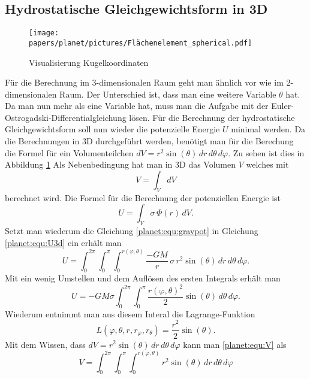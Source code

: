 \subsection{Hydrostatische Gleichgewichtsform in 3D}
\begin{figure}
	\centering
	\texttt{[image: papers/planet/pictures/Flächenelement\_spherical.pdf]}
	\caption{Visualisierung Kugelkoordinaten}
	\label{planet:fig:3d}
\end{figure}
Für die Berechnung im 3-dimensionalen Raum geht man ähnlich vor wie im 2-dimensionalen Raum.
Der Unterschied ist, dass man eine weitere Variable \(\theta\) hat.
Da man nun mehr als eine Variable hat, muss man die Aufgabe mit der Euler-Ostrogadski-Differentialgleichung lösen.
Für die Berechnung der hydrostatische Gleichgewichtsform soll nun wieder die potenzielle Energie \(U\) minimal werden.
Da die Berechnungen in 3D durchgeführt werden, benötigt man für die Berechung die Formel für ein Volumenteilchen \(dV = r^2 \sin (\theta) \, dr \, d\theta \, d\varphi \).
Zu sehen ist dies in Abbildung \ref{planet:fig:3d}
Als Nebenbedingung hat man in 3D das Volumen \(V\) welches mit 
\begin{equation}
	V = \int_{V}^{} dV
	\label{planet:equ:V}
\end{equation}
berechnet wird.
Die Formel für die Berechnung der potenziellen Energie ist
\begin{equation}
	U = \int_{V} \sigma \,  \Phi (r)\, dV.
	\label{planet:equ:U3d}
\end{equation}
Setzt man wiederum die Gleichung \eqref{planet:equ:gravpot} in Gleichung \eqref{planet:equ:U3d} ein erhält man
\begin{equation*}
	U = \int_{0}^{2\pi}
	\int_{0}^{\pi}
	\int_{0}^{r(\varphi,\theta)}
	\frac{-GM}{r}\, \sigma\, r^2 \sin (\theta) \,
	dr \, d\theta \, d\varphi.
\end{equation*}
Mit ein wenig Umstellen und dem Auflösen des ersten Integrals erhält man
\begin{equation*}
	U =-GM\sigma \int_{0}^{2\pi}\int_{0}^{\pi}\frac{r(\varphi,\theta)^2}{2}  \sin (\theta) \, d\theta \, d\varphi.
\end{equation*}
Wiederum entnimmt man aus diesem Interal die Lagrange-Funktion
\begin{equation*}
	L(\varphi,\theta ,r,r_\varphi,r_\theta) = \frac{r^2}{2}  \sin (\theta).
\end{equation*}
Mit dem Wissen, dass \(dV = r^2 \sin (\theta) \, dr \, d\theta \, d\varphi \) kann man \eqref{planet:equ:V} als
\begin{equation*}
	V = \int_{0}^{2\pi}\int_{0}^{\pi}\int_{0}^{r(\varphi,\theta)} r^2 \sin (\theta) \, dr \, d\theta \, d\varphi
\end{equation*}
